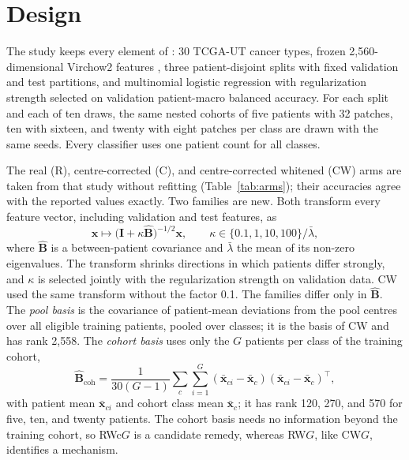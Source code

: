 \documentclass[11pt]{article}
\begin{document}
\section{Design}
\label{sec:design}
The study keeps every element of \citet{queisler2026centreError}: 30 TCGA-UT cancer types, frozen 2,560-dimensional Virchow2 features \citep{zimmermann2024virchow2}, three patient-disjoint splits with fixed validation and test partitions, and multinomial logistic regression with regularization strength selected on validation patient-macro balanced accuracy. For each split and each of ten draws, the same nested cohorts of five patients with 32 patches, ten with sixteen, and twenty with eight patches per class are drawn with the same seeds. Every classifier uses one patient count for all classes.

The real (R), centre-corrected (C), and centre-corrected whitened (CW) arms are taken from that study without refitting (Table~\ref{tab:arms}); their accuracies agree with the reported values exactly. Two families are new. Both transform every feature vector, including validation and test features, as
\begin{equation}
  \mathbf x\mapsto\bigl(\mathbf I+\kappa\hat{\mathbf B}\bigr)^{-1/2}\mathbf x,\qquad \kappa\in\{0.1,1,10,100\}/\bar\lambda,
  \label{eq:whiten}
\end{equation}
\noindent where $\hat{\mathbf B}$ is a between-patient covariance and $\bar\lambda$ the mean of its non-zero eigenvalues. The transform shrinks directions in which patients differ strongly, and $\kappa$ is selected jointly with the regularization strength on validation data. CW used the same transform without the factor 0.1. The families differ only in $\hat{\mathbf B}$. The \emph{pool basis} is the covariance of patient-mean deviations from the pool centres over all eligible training patients, pooled over classes; it is the basis of CW and has rank 2,558. The \emph{cohort basis} uses only the $G$ patients per class of the training cohort,
\begin{equation}
  \hat{\mathbf B}_{\mathrm{coh}}=\frac{1}{30(G-1)}\sum_{c}\sum_{i=1}^{G}(\bar{\mathbf x}_{ci}-\bar{\mathbf x}_c)(\bar{\mathbf x}_{ci}-\bar{\mathbf x}_c)^{\top},
  \label{eq:cohort}
\end{equation}
\noindent with patient mean $\bar{\mathbf x}_{ci}$ and cohort class mean $\bar{\mathbf x}_c$; it has rank 120, 270, and 570 for five, ten, and twenty patients. The cohort basis needs no information beyond the training cohort, so RWc$G$ is a candidate remedy, whereas RW$G$, like CW$G$, identifies a mechanism.
\end{document}
